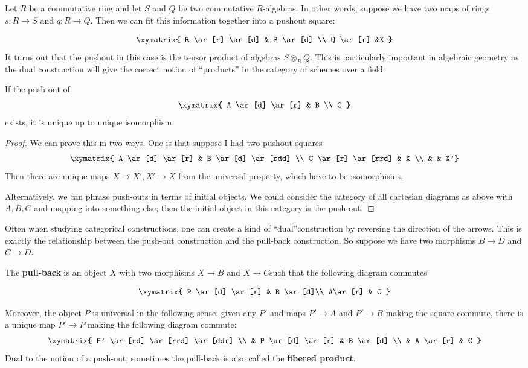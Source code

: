 \begin{example}
Let $R$ be a commutative ring and let $S$ and $Q$ be two commutative
$R$-algebras. In other words, suppose
we have two maps of rings $s:R\rightarrow S$ and $q:R\rightarrow Q$. Then we
can fit this information together
into a pushout square:

\[ \xymatrix{
R \ar[r] \ar[d]  &  S \ar[d]   \\
Q \ar[r] &X
}\]
It turns out that the pushout in this case is the tensor product of algebras
$S\otimes_R Q$. This is particularly important
in algebraic geometry as the dual construction will give the correct notion of
``products'' in the category of schemes over
a field.\end{example}

\begin{proposition}
If the push-out of
\[ \xymatrix{
A \ar[d] \ar[r] & B \\
C
}\]
exists, it is unique up to unique isomorphism.
\end{proposition}
\begin{proof}
We can prove this in two ways. One is that suppose I had two pushout squares
\[
\xymatrix{
A \ar[d] \ar[r] &  B \ar[d] \ar[rdd] \\
C \ar[r] \ar[rrd] &  X \\
& & X'}
\]
Then there are unique maps $X \to X', X' \to X$ from the universal property,
which have to be isomorphisms.

Alternatively, we can phrase push-outs in terms of initial objects. We could
consider the category of all cartesian diagrams as above with $A,B,C$ and
mapping into something else; then the initial
object in this category is the push-out.
\end{proof}

Often when studying categorical constructions, one can create a kind of
``dual''construction by reversing the direction of the arrows. This is exactly
the
relationship between the push-out construction and the pull-back construction.
So suppose we have two morphisms $B \to D$ and $C\to D$.
\begin{definition}
The \textbf{pull-back} is an object $X$ with two morphisms $X\to B$ and $X\to
C$such that the following diagram commutes

\[ \xymatrix {
P \ar[d] \ar[r] & B \ar[d]\\
A\ar[r] & C }\]

Moreover, the object $P$ is universal in the following sense: given any $P'$
and maps $P'\to A$ and $P'\to B$ making the square commute, there is a
unique map
$P'\to P$ making the following diagram commute:
\[
\xymatrix{
 P' \ar[rd] \ar[rrd] \ar[ddr] \\
& P \ar[d] \ar[r] &  B \ar[d] \\
& A \ar[r] &  C }\]
Dual to the notion of a push-out, sometimes the pull-back is also called the
\textbf{fibered product}.
\end{definition}


